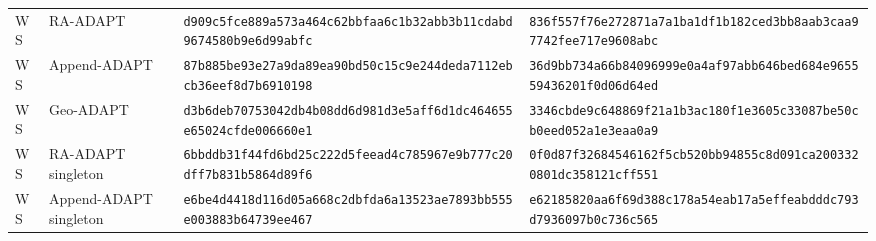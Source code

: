 \documentclass[10pt,letterpaper]{article}
\begin{document}
\begin{longtable}{@{}llp{2.55in}p{2.55in}@{}}
WS & RA-ADAPT & \texttt{d909c5fc}\allowbreak{}\texttt{e889a573}\allowbreak{}\texttt{a464c62b}\allowbreak{}\texttt{bfaa6c1b}\allowbreak{}\texttt{32abb3b1}\allowbreak{}\texttt{1cdabd96}\allowbreak{}\texttt{74580b9e}\allowbreak{}\texttt{6d99abfc}\allowbreak{} & \texttt{836f557f}\allowbreak{}\texttt{76e27287}\allowbreak{}\texttt{1a7a1ba1}\allowbreak{}\texttt{df1b182c}\allowbreak{}\texttt{ed3bb8aa}\allowbreak{}\texttt{b3caa977}\allowbreak{}\texttt{42fee717}\allowbreak{}\texttt{e9608abc}\allowbreak{} \\
WS & Append-ADAPT & \texttt{87b885be}\allowbreak{}\texttt{93e27a9d}\allowbreak{}\texttt{a89ea90b}\allowbreak{}\texttt{d50c15c9}\allowbreak{}\texttt{e244deda}\allowbreak{}\texttt{7112ebcb}\allowbreak{}\texttt{36eef8d7}\allowbreak{}\texttt{b6910198}\allowbreak{} & \texttt{36d9bb73}\allowbreak{}\texttt{4a66b840}\allowbreak{}\texttt{96999e0a}\allowbreak{}\texttt{4af97abb}\allowbreak{}\texttt{646bed68}\allowbreak{}\texttt{4e965559}\allowbreak{}\texttt{436201f0}\allowbreak{}\texttt{d06d64ed}\allowbreak{} \\
WS & Geo-ADAPT & \texttt{d3b6deb7}\allowbreak{}\texttt{0753042d}\allowbreak{}\texttt{b4b08dd6}\allowbreak{}\texttt{d981d3e5}\allowbreak{}\texttt{aff6d1dc}\allowbreak{}\texttt{464655e6}\allowbreak{}\texttt{5024cfde}\allowbreak{}\texttt{006660e1}\allowbreak{} & \texttt{3346cbde}\allowbreak{}\texttt{9c648869}\allowbreak{}\texttt{f21a1b3a}\allowbreak{}\texttt{c180f1e3}\allowbreak{}\texttt{605c3308}\allowbreak{}\texttt{7be50cb0}\allowbreak{}\texttt{eed052a1}\allowbreak{}\texttt{e3eaa0a9}\allowbreak{} \\
WS & RA-ADAPT singleton & \texttt{6bbddb31}\allowbreak{}\texttt{f44fd6bd}\allowbreak{}\texttt{25c222d5}\allowbreak{}\texttt{feead4c7}\allowbreak{}\texttt{85967e9b}\allowbreak{}\texttt{777c20df}\allowbreak{}\texttt{f7b831b5}\allowbreak{}\texttt{864d89f6}\allowbreak{} & \texttt{0f0d87f3}\allowbreak{}\texttt{26845461}\allowbreak{}\texttt{62f5cb52}\allowbreak{}\texttt{0bb94855}\allowbreak{}\texttt{c8d091ca}\allowbreak{}\texttt{20033208}\allowbreak{}\texttt{01dc3581}\allowbreak{}\texttt{21cff551}\allowbreak{} \\
WS & Append-ADAPT singleton & \texttt{e6be4d44}\allowbreak{}\texttt{18d116d0}\allowbreak{}\texttt{5a668c2d}\allowbreak{}\texttt{bfda6a13}\allowbreak{}\texttt{523ae789}\allowbreak{}\texttt{3bb555e0}\allowbreak{}\texttt{03883b64}\allowbreak{}\texttt{739ee467}\allowbreak{} & \texttt{e6218582}\allowbreak{}\texttt{0aa6f69d}\allowbreak{}\texttt{388c178a}\allowbreak{}\texttt{54eab17a}\allowbreak{}\texttt{5effeabd}\allowbreak{}\texttt{ddc793d7}\allowbreak{}\texttt{936097b0}\allowbreak{}\texttt{c736c565}\allowbreak{} \\

\end{longtable}
\end{document}
